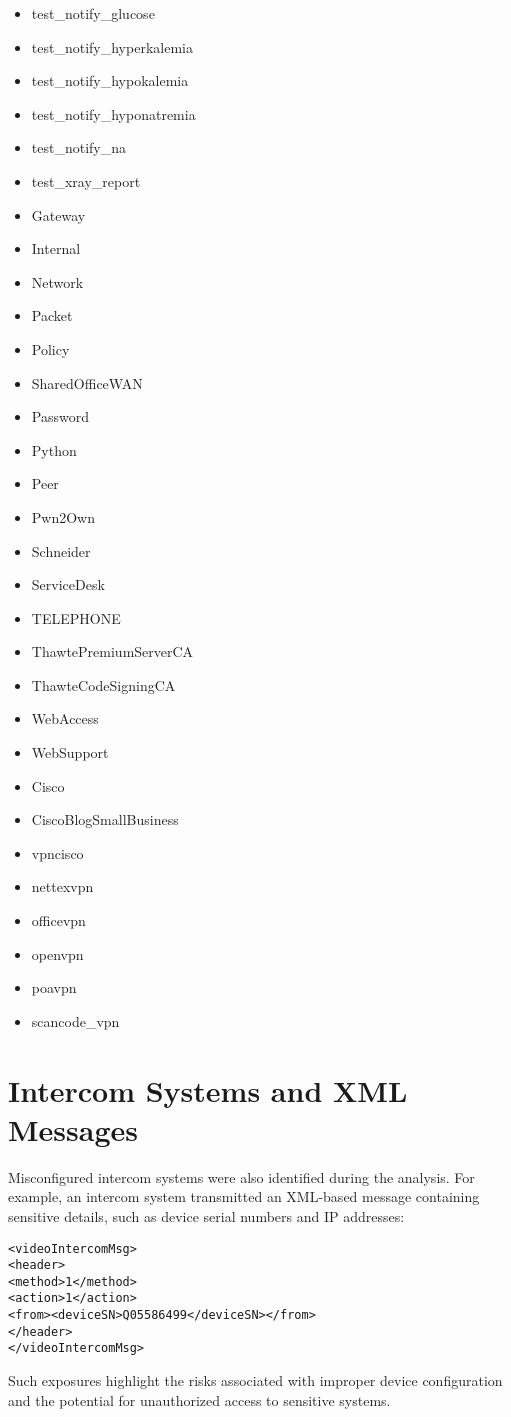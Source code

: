         \begin{itemize}
            \item test\_notify\_glucose
            \item test\_notify\_hyperkalemia
            \item test\_notify\_hypokalemia
            \item test\_notify\_hyponatremia
            \item test\_notify\_na
            \item test\_xray\_report
            \item Gateway
            \item Internal
            \item Network
            \item Packet
            \item Policy
            \item SharedOfficeWAN
            \item Password
            \item Python
            \item Peer
            \item Pwn2Own
            \item Schneider
            \item ServiceDesk
            \item TELEPHONE
            \item ThawtePremiumServerCA
            \item ThawteCodeSigningCA
            \item WebAccess
            \item WebSupport
            \item Cisco
            \item CiscoBlogSmallBusiness
            \item vpncisco
            \item nettexvpn
            \item officevpn
            \item openvpn
            \item poavpn
            \item scancode\_vpn
        \end{itemize}

\section{Intercom Systems and XML Messages}
Misconfigured intercom systems were also identified during the analysis. For example, an intercom system transmitted an XML-based message containing sensitive details, such as device serial numbers and IP addresses:
\begin{verbatim}
<videoIntercomMsg>
<header>
<method>1</method>
<action>1</action>
<from><deviceSN>Q05586499</deviceSN></from>
</header>
</videoIntercomMsg>
\end{verbatim}
Such exposures highlight the risks associated with improper device configuration and the potential for unauthorized access to sensitive systems.


